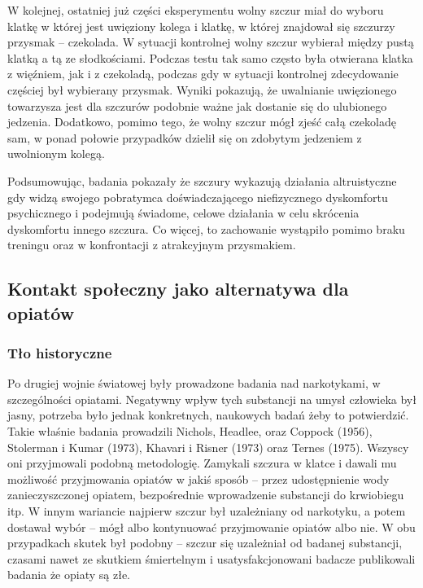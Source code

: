 \documentclass{psychol}
\begin{document}
W kolejnej, ostatniej już części eksperymentu wolny szczur miał do wyboru klatkę w której jest uwięziony kolega i klatkę, w której znajdował się szczurzy przysmak -- czekolada. W sytuacji kontrolnej wolny szczur wybierał między pustą klatką a tą ze słodkościami. Podczas testu tak samo często była otwierana klatka z więźniem, jak i z czekoladą, podczas gdy w sytuacji kontrolnej zdecydowanie częściej był wybierany przysmak. Wyniki pokazują, że uwalnianie uwięzionego towarzysza jest dla szczurów podobnie ważne jak dostanie się do ulubionego jedzenia. Dodatkowo, pomimo tego, że wolny szczur mógł zjeść całą czekoladę sam, w ponad połowie przypadków dzielił się on zdobytym jedzeniem z uwolnionym kolegą.

Podsumowując, badania pokazały że szczury wykazują działania altruistyczne gdy widzą swojego pobratymca doświadczającego niefizycznego dyskomfortu psychicznego i podejmują świadome, celowe działania w celu skrócenia dyskomfortu innego szczura. Co więcej, to zachowanie wystąpiło pomimo braku treningu oraz w konfrontacji z atrakcyjnym przysmakiem.

\subsection{Kontakt społeczny jako alternatywa dla opiatów}

\subsubsection{Tło historyczne}

Po drugiej wojnie światowej były prowadzone badania nad narkotykami, w szczególności opiatami. Negatywny wpływ tych substancji na umysł człowieka był jasny, potrzeba było jednak konkretnych, naukowych badań żeby to potwierdzić. Takie właśnie badania prowadzili Nichols, Headlee, oraz Coppock (1956), Stolerman i Kumar (1973), Khavari i Risner (1973) oraz Ternes (1975). Wszyscy oni przyjmowali podobną metodologię. Zamykali szczura w klatce i dawali mu możliwość przyjmowania opiatów w jakiś sposób -- przez udostępnienie wody zanieczyszczonej opiatem, bezpośrednie wprowadzenie substancji do krwiobiegu itp. W innym wariancie najpierw szczur był uzależniany od narkotyku, a potem dostawał wybór -- mógł albo kontynuować przyjmowanie opiatów albo nie. W obu przypadkach skutek był podobny -- szczur się uzależniał od badanej substancji, czasami nawet ze skutkiem śmiertelnym i usatysfakcjonowani badacze publikowali badania że opiaty są złe.
\end{document}
